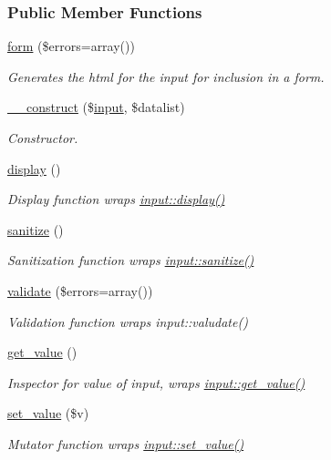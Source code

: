 \subsubsection*{Public Member Functions}
\begin{DoxyCompactItemize}
\item 
\hyperlink{classdatalist__input_aba53bff8ed66c85b97ce1ff23bfc15ec}{form} (\$errors=array())
\begin{DoxyCompactList}\small\item\em Generates the html for the input for inclusion in a form. \end{DoxyCompactList}\item 
\hyperlink{classdatalist__input_a7549bdcd2d6100834cf256e5fdd68d2d}{\-\_\-\-\_\-construct} (\$\hyperlink{classinput}{input}, \$datalist)
\begin{DoxyCompactList}\small\item\em Constructor. \end{DoxyCompactList}\item 
\hyperlink{classdatalist__input_a6f94bf1247bd5da6f79c864b18073ed5}{display} ()
\begin{DoxyCompactList}\small\item\em Display function wraps \hyperlink{classinput_a993053ef011cade1db0ceaccb1f4da53}{input\-::display()} \end{DoxyCompactList}\item 
\hyperlink{classdatalist__input_a52e50cc544ff141a03c2fc65bfdaf9ea}{sanitize} ()
\begin{DoxyCompactList}\small\item\em Sanitization function wraps \hyperlink{classinput_ab8456d2b5a929801af6fe0b36afd458c}{input\-::sanitize()} \end{DoxyCompactList}\item 
\hyperlink{classdatalist__input_ab2827973f443100315d378d4a97b9516}{validate} (\$errors=array())
\begin{DoxyCompactList}\small\item\em Validation function wraps input\-::valudate() \end{DoxyCompactList}\item 
\hyperlink{classdatalist__input_afeb3a182794c4fb9c235c888b2029430}{get\-\_\-value} ()
\begin{DoxyCompactList}\small\item\em Inspector for value of input, wraps \hyperlink{classinput_a1b3bcdbb596a1154a944a169ac67f547}{input\-::get\-\_\-value()} \end{DoxyCompactList}\item 
\hyperlink{classdatalist__input_a73b5d2cfe2f300a62a39f5dfd5a18e70}{set\-\_\-value} (\$v)
\begin{DoxyCompactList}\small\item\em Mutator function wraps \hyperlink{classinput_a2383e00d55bf3dbcc7071b2fe1336aec}{input\-::set\-\_\-value()} \end{DoxyCompactList}\end{DoxyCompactItemize}
